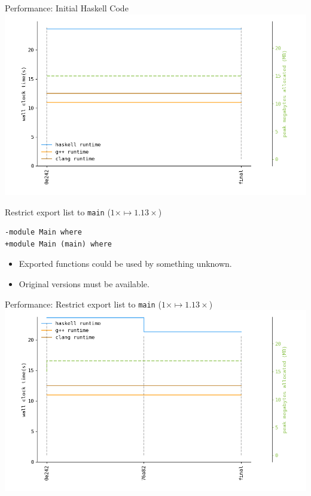 \documentclass[8pt]{beamer}
\begin{document}
\begin{frame}[fragile]{Performance: Initial Haskell Code}
\includegraphics[height=0.6\textwidth]{perfdata-upto-0e242-gen.png}
\end{frame}


\begin{frame}[fragile]{Restrict export list to \texttt{main} ($1\times \mapsto 1.13\times$)}
\begin{verbatim}
-module Main where
+module Main (main) where
\end{verbatim}

\pause
\begin{itemize}
\item Exported functions could be used by something unknown.
\item Original versions must be available.
\end{itemize}
\end{frame}

\begin{frame}[fragile]{Performance: Restrict export list to \texttt{main} ($1\times \mapsto 1.13\times$)}
\includegraphics[height=0.6\textwidth]{perfdata-upto-76a82-gen.png}
\end{frame}
\end{document}
